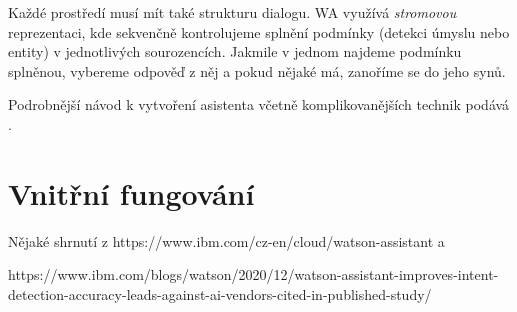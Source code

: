 Každé prostředí musí mít také strukturu dialogu.
WA využívá \textit{stromovou} reprezentaci,
kde sekvenčně kontrolujeme splnění podmínky (detekci úmyslu nebo entity) v
jednotlivých sourozencích. Jakmile v jednom najdeme podmínku splněnou, vybereme
odpověď z něj a pokud nějaké má, zanoříme se do jeho synů.

Podrobnější návod k vytvoření asistenta včetně komplikovanějších
technik podává \citet{akbulut_common_2020}.

\section{Vnitřní fungování}\label{wa-inside}

Nějaké shrnutí z https://www.ibm.com/cz-en/cloud/watson-assistant a

https://www.ibm.com/blogs/watson/2020/12/watson-assistant-improves-intent-detection-accuracy-leads-against-ai-vendors-cited-in-published-study/